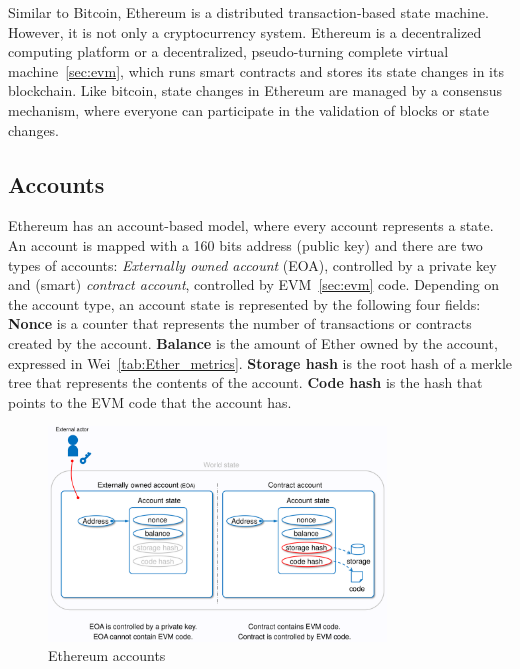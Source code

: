 \documentclass[11pt,a4paper]{report}
\begin{document}
Similar to Bitcoin, Ethereum\cite{article:eth}\cite{book:masteringETH} is a distributed transaction-based state machine. However, it is not only a cryptocurrency system. Ethereum is a decentralized computing platform or a decentralized, pseudo-turning complete virtual machine~\ref{sec:evm}, which runs smart contracts and stores its state changes in its blockchain. Like bitcoin, state changes in Ethereum are managed by a consensus mechanism, where everyone can participate in the validation of  blocks or state changes.

\subsection{Accounts}\label{sec:accounts}
Ethereum\cite{article:eth}\cite{wood2014ethereum} has an account-based model, where every account represents a state. An account is mapped with a 160 bits address (public key) and there are two types of accounts: \textit{Externally owned account} (EOA), controlled by a private key and (smart) \textit{contract account}, controlled by EVM~\ref{sec:evm} code. Depending on the account type, an account state is represented by the following four fields: \textbf{Nonce} is a counter that represents the number of transactions or contracts created by the account. \textbf{Balance} is the amount of Ether owned by the account, expressed in Wei~\ref{tab:Ether_metrics}. \textbf{Storage hash} is the root hash of a merkle tree that represents the contents of the account. \textbf{Code hash} is the hash that points to the EVM code that the account has.
\begin{figure}[htp]
	\centering
	\includegraphics[width=0.8\textwidth]{./images/accounts}
	\caption{Ethereum accounts\cite{evm-illustrate}}
	\label{fig:accounts}
\end{figure}
\end{document}
